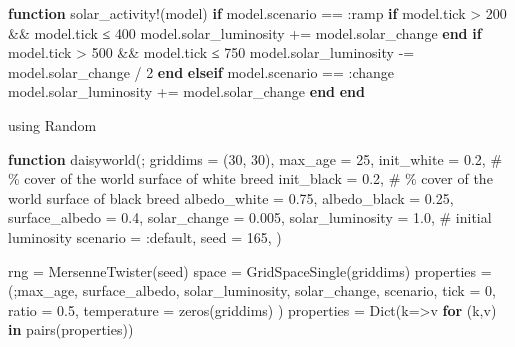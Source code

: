 \documentclass[
  english,
  russian,
  12pt,
  a4paper,
  DIV=11,
  numbers=noendperiod]{scrreprt}
\newenvironment{Shaded}{\begin{snugshade}}{\end{snugshade}}
\newcommand{\BuiltInTok}[1]{\textcolor[rgb]{0.00,0.23,0.31}{#1}}
\newcommand{\CommentTok}[1]{\textcolor[rgb]{0.37,0.37,0.37}{#1}}
\newcommand{\ControlFlowTok}[1]{\textcolor[rgb]{0.00,0.23,0.31}{\textbf{#1}}}
\newcommand{\FloatTok}[1]{\textcolor[rgb]{0.68,0.00,0.00}{#1}}
\newcommand{\FunctionTok}[1]{\textcolor[rgb]{0.28,0.35,0.67}{#1}}
\newcommand{\ImportTok}[1]{\textcolor[rgb]{0.00,0.46,0.62}{#1}}
\newcommand{\KeywordTok}[1]{\textcolor[rgb]{0.00,0.23,0.31}{\textbf{#1}}}
\newcommand{\NormalTok}[1]{\textcolor[rgb]{0.00,0.23,0.31}{#1}}
\newcommand{\OperatorTok}[1]{\textcolor[rgb]{0.37,0.37,0.37}{#1}}
\begin{document}
\begin{Shaded}
\begin{Highlighting}[]
\KeywordTok{function} \FunctionTok{solar\_activity!}\NormalTok{(model)}
    \ControlFlowTok{if}\NormalTok{ model.scenario }\OperatorTok{==} \OperatorTok{:}\NormalTok{ramp}
        \ControlFlowTok{if}\NormalTok{ model.tick }\OperatorTok{\textgreater{}} \FloatTok{200} \OperatorTok{\&\&}\NormalTok{ model.tick }\OperatorTok{≤} \FloatTok{400}
\NormalTok{            model.solar\_luminosity }\OperatorTok{+=}\NormalTok{ model.solar\_change}
        \ControlFlowTok{end}
        \ControlFlowTok{if}\NormalTok{ model.tick }\OperatorTok{\textgreater{}} \FloatTok{500} \OperatorTok{\&\&}\NormalTok{ model.tick }\OperatorTok{≤} \FloatTok{750}
\NormalTok{            model.solar\_luminosity }\OperatorTok{{-}=}\NormalTok{ model.solar\_change }\OperatorTok{/} \FloatTok{2}
        \ControlFlowTok{end}
    \ControlFlowTok{elseif}\NormalTok{ model.scenario }\OperatorTok{==} \OperatorTok{:}\NormalTok{change}
\NormalTok{        model.solar\_luminosity }\OperatorTok{+=}\NormalTok{ model.solar\_change}
    \ControlFlowTok{end}
\KeywordTok{end}

\ImportTok{using} \BuiltInTok{Random}

\KeywordTok{function} \FunctionTok{daisyworld}\NormalTok{(;}
\NormalTok{    griddims }\OperatorTok{=}\NormalTok{ (}\FloatTok{30}\NormalTok{, }\FloatTok{30}\NormalTok{),}
\NormalTok{    max\_age }\OperatorTok{=} \FloatTok{25}\NormalTok{,}
\NormalTok{    init\_white }\OperatorTok{=} \FloatTok{0.2}\NormalTok{, }\CommentTok{\# \% cover of the world surface of white breed}
\NormalTok{    init\_black }\OperatorTok{=} \FloatTok{0.2}\NormalTok{, }\CommentTok{\# \% cover of the world surface of black breed}
\NormalTok{    albedo\_white }\OperatorTok{=} \FloatTok{0.75}\NormalTok{,}
\NormalTok{    albedo\_black }\OperatorTok{=} \FloatTok{0.25}\NormalTok{,}
\NormalTok{    surface\_albedo }\OperatorTok{=} \FloatTok{0.4}\NormalTok{,}
\NormalTok{    solar\_change }\OperatorTok{=} \FloatTok{0.005}\NormalTok{,}
\NormalTok{    solar\_luminosity }\OperatorTok{=} \FloatTok{1.0}\NormalTok{, }\CommentTok{\# initial luminosity}
\NormalTok{    scenario }\OperatorTok{=} \OperatorTok{:}\NormalTok{default,}
\NormalTok{    seed }\OperatorTok{=} \FloatTok{165}\NormalTok{,}
\NormalTok{)}

\NormalTok{    rng }\OperatorTok{=} \FunctionTok{MersenneTwister}\NormalTok{(seed)}
\NormalTok{    space }\OperatorTok{=} \FunctionTok{GridSpaceSingle}\NormalTok{(griddims)}
\NormalTok{    properties }\OperatorTok{=}\NormalTok{ (;max\_age, surface\_albedo, solar\_luminosity, solar\_change, scenario,}
\NormalTok{        tick }\OperatorTok{=} \FloatTok{0}\NormalTok{, ratio }\OperatorTok{=} \FloatTok{0.5}\NormalTok{, temperature }\OperatorTok{=} \FunctionTok{zeros}\NormalTok{(griddims)}
\NormalTok{    )}
\NormalTok{    properties }\OperatorTok{=} \FunctionTok{Dict}\NormalTok{(k}\OperatorTok{=\textgreater{}}\NormalTok{v }\ControlFlowTok{for}\NormalTok{ (k,v) }\KeywordTok{in} \FunctionTok{pairs}\NormalTok{(properties))}


\end{Highlighting}
\end{Shaded}
\end{document}
